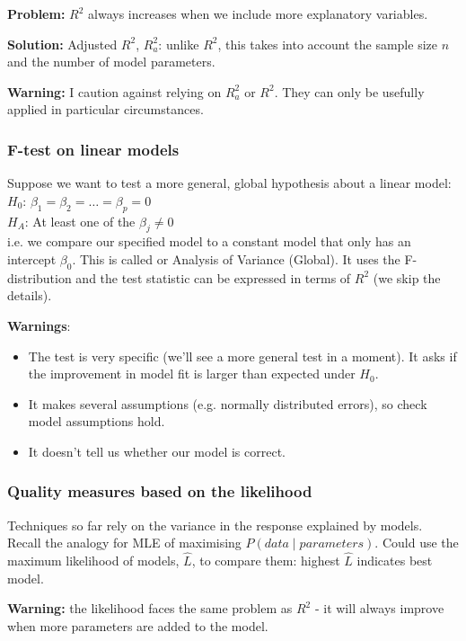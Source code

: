 \textbf{Problem:} $R^2$ always increases when we include more explanatory variables.

\textbf{Solution:} Adjusted $R^2$, $R^2_a$: unlike $R^2$, this takes into account the sample size $n$ and the number of model parameters.

\textbf{Warning:} I caution against relying on $R^2_a$ or $R^2$. They can only be usefully applied in particular circumstances.

\subsubsection{F-test on linear models}

Suppose we want to test a more general, global hypothesis about a linear model: \\
$H_0$: $\beta_1=\beta_2=\dots=\beta_p=0$ \\
$H_A$: At least one of the $\beta_j\neq 0$ \\
i.e. we compare our specified model to a constant model that only has an intercept $\beta_0$. This is called  or Analysis of Variance (Global). It uses the F-distribution and the test statistic can be expressed in terms of $R^2$ (we skip the details).

\textbf{Warnings}:
\begin{itemize}
	\item The test is very specific (we'll see a more general test in a moment). It asks if the improvement in model fit is larger than expected under $H_0$.
	\item It makes several assumptions (e.g. normally distributed errors), so check model assumptions hold.
	\item It doesn't tell us whether our model is correct.
\end{itemize}

\subsubsection{Quality measures based on the likelihood}

Techniques so far rely on the variance in the response explained by models. Recall the analogy for MLE of maximising $P(data\mid parameters)$. Could use the maximum likelihood of models, $\hat{L}$, to compare them: highest $\hat{L}$ indicates best model.

\textbf{Warning:} the likelihood faces the same problem as $R^2$ - it will always improve when more parameters are added to the model.

